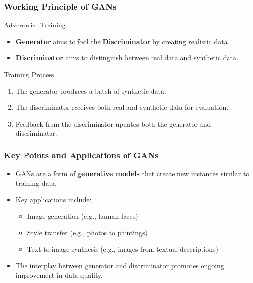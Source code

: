 \documentclass[aspectratio=169]{beamer}
\begin{document}
\begin{frame}[fragile]
    \frametitle{Working Principle of GANs}
    \begin{block}{Adversarial Training}
        \begin{itemize}
            \item \textbf{Generator} aims to fool the \textbf{Discriminator} by creating realistic data.
            \item \textbf{Discriminator} aims to distinguish between real data and synthetic data.
        \end{itemize}
    \end{block}

    \begin{block}{Training Process}
        \begin{enumerate}
            \item The generator produces a batch of synthetic data.
            \item The discriminator receives both real and synthetic data for evaluation.
            \item Feedback from the discriminator updates both the generator and discriminator.
        \end{enumerate}
    \end{block}
\end{frame}

\begin{frame}[fragile]
    \frametitle{Key Points and Applications of GANs}
    \begin{itemize}
        \item GANs are a form of \textbf{generative models} that create new instances similar to training data.
        \item Key applications include:
        \begin{itemize}
            \item Image generation (e.g., human faces)
            \item Style transfer (e.g., photos to paintings)
            \item Text-to-image synthesis (e.g., images from textual descriptions)
        \end{itemize}
        \item The interplay between generator and discriminator promotes ongoing improvement in data quality.
    \end{itemize}
\end{frame}
\end{document}
